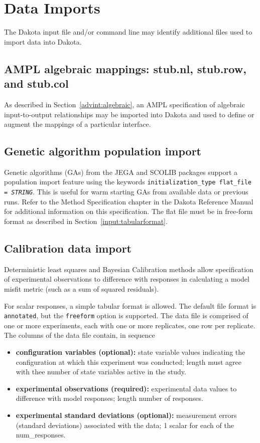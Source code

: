 \section{Data Imports}\label{input:import}

The Dakota input file and/or command line may identify additional
files used to import data into Dakota.

\subsection{AMPL algebraic mappings: stub.nl, stub.row, and stub.col}

As described in Section~\ref{advint:algebraic}, an AMPL
specification of algebraic input-to-output relationships may be
imported into Dakota and used to define or augment the mappings of a
particular interface.

\subsection{Genetic algorithm population import}

Genetic algorithms (GAs) from the JEGA and SCOLIB packages support a
population import feature using the keywords
\texttt{initialization\_type flat\_file = \emph{STRING}}.  This is
useful for warm starting GAs from available data or previous runs.
Refer to the Method Specification chapter in the Dakota Reference
Manual~\cite{RefMan} for additional information on this specification.
The flat file must be in free-form format as described in
Section~\ref{input:tabularformat}.

\subsection{Calibration data import}\label{input:calib_data}

Deterministic least squares and Bayesian Calibration methods allow
specification of experimental observations to difference with
responses in calculating a model misfit metric (such as a sum of
squared residuals). 

For scalar responses, a simple tabular format is allowed.  The default
file format is {\tt annotated}, but the {\tt freeform} option is
supported.  The data file is comprised of one or more experiments,
each with one or more replicates, one row per replicate.  The columns
of the data file contain, in sequence
\begin{itemize}
\item {\bf configuration variables (optional):} state variable values
  indicating the configuration at which this experiment was conducted;
  length must agree with thee number of state variables active in the
  study.
\item {\bf experimental observations (required):} experimental data
  values to difference with model responses; length number of
  responses.
\item {\bf experimental standard deviations (optional):} measurement
  errors (standard deviations) associated with the data; 1 scalar for
  each of the num\_responses.
\end{itemize}

